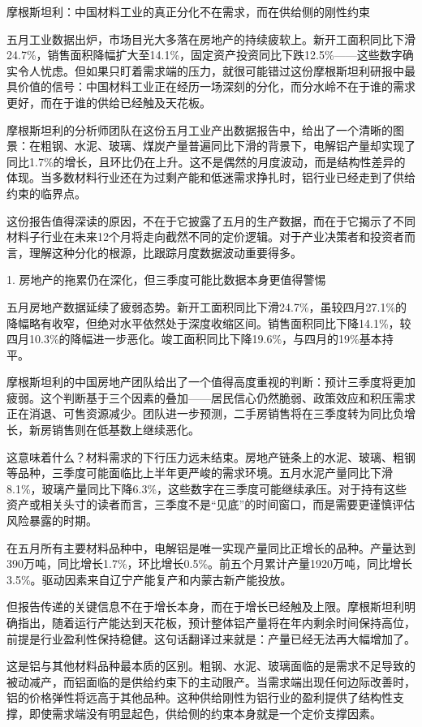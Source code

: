 \documentclass[11pt]{ctexart}
\begin{document}
摩根斯坦利：中国材料工业的真正分化不在需求，而在供给侧的刚性约束

五月工业数据出炉，市场目光大多落在房地产的持续疲软上。新开工面积同比下滑24.7\%，销售面积降幅扩大至14.1\%，固定资产投资同比下跌12.5\%——这些数字确实令人忧虑。但如果只盯着需求端的压力，就很可能错过这份摩根斯坦利研报中最具价值的信号：中国材料工业正在经历一场深刻的分化，而分水岭不在于谁的需求更好，而在于谁的供给已经触及天花板。

摩根斯坦利的分析师团队在这份五月工业产出数据报告中，给出了一个清晰的图景：在粗钢、水泥、玻璃、煤炭产量普遍同比下滑的背景下，电解铝产量却实现了同比1.7\%的增长，且环比仍在上升。这不是偶然的月度波动，而是结构性差异的体现。当多数材料行业还在为过剩产能和低迷需求挣扎时，铝行业已经走到了供给约束的临界点。

这份报告值得深读的原因，不在于它披露了五月的生产数据，而在于它揭示了不同材料子行业在未来12个月将走向截然不同的定价逻辑。对于产业决策者和投资者而言，理解这种分化的根源，比跟踪月度数据波动重要得多。

1. 房地产的拖累仍在深化，但三季度可能比数据本身更值得警惕

五月房地产数据延续了疲弱态势。新开工面积同比下滑24.7\%，虽较四月27.1\%的降幅略有收窄，但绝对水平依然处于深度收缩区间。销售面积同比下降14.1\%，较四月10.3\%的降幅进一步恶化。竣工面积同比下降19.6\%，与四月的19\%基本持平。

摩根斯坦利的中国房地产团队给出了一个值得高度重视的判断：预计三季度将更加疲弱。这个判断基于三个因素的叠加——居民信心仍然脆弱、政策效应和积压需求正在消退、可售资源减少。团队进一步预测，二手房销售将在三季度转为同比负增长，新房销售则在低基数上继续恶化。

这意味着什么？材料需求的下行压力远未结束。房地产链条上的水泥、玻璃、粗钢等品种，三季度可能面临比上半年更严峻的需求环境。五月水泥产量同比下滑8.1\%，玻璃产量同比下降6.3\%，这些数字在三季度可能继续承压。对于持有这些资产或相关头寸的读者而言，三季度不是“见底”的时间窗口，而是需要更谨慎评估风险暴露的时期。

在五月所有主要材料品种中，电解铝是唯一实现产量同比正增长的品种。产量达到390万吨，同比增长1.7\%，环比增长0.5\%。前五个月累计产量1920万吨，同比增长3.5\%。驱动因素来自辽宁产能复产和内蒙古新产能投放。

但报告传递的关键信息不在于增长本身，而在于增长已经触及上限。摩根斯坦利明确指出，随着运行产能达到天花板，预计整体铝产量将在年内剩余时间保持高位，前提是行业盈利性保持稳健。这句话翻译过来就是：产量已经无法再大幅增加了。

这是铝与其他材料品种最本质的区别。粗钢、水泥、玻璃面临的是需求不足导致的被动减产，而铝面临的是供给约束下的主动限产。当需求端出现任何边际改善时，铝的价格弹性将远高于其他品种。这种供给刚性为铝行业的盈利提供了结构性支撑，即使需求端没有明显起色，供给侧的约束本身就是一个定价支撑因素。
\end{document}
